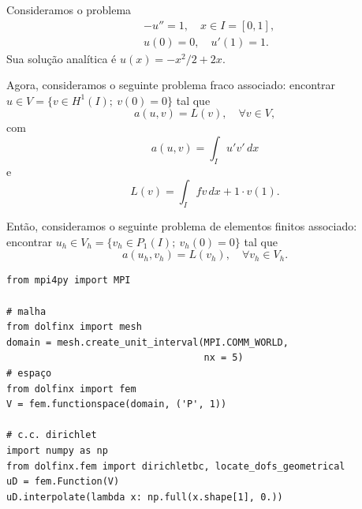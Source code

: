 \begin{ex}\label{ex:cc_n2}
  Consideramos o problema
  \begin{align}
    &-u'' = 1,\quad x\in I=[0,1],\label{eq:ex_cc_n2_eq}\\
    &u(0) = 0,\quad u'(1) = 1.\label{eq:ex_cc_n2_bc}
  \end{align}
Sua solução analítica é $u(x) = -x^2/2+2x$. 

Agora, consideramos o seguinte problema fraco associado: encontrar $u\in V=\{v\in H^1(I);~v(0)=0\}$ tal que
\begin{equation}
  a(u,v) = L(v),\quad\forall v\in V,
\end{equation}
com
\begin{equation}
  a(u, v) = \int_I u'v'\,dx
\end{equation}
e
\begin{equation}
  L(v) = \int_I fv\,dx + 1\cdot v(1).
\end{equation}

Então, consideramos o seguinte problema de elementos finitos associado: encontrar $u_h\in V_h = \{v_h\in P_1(I);~v_h(0)=0\}$ tal que
\begin{equation}
  a(u_h, v_h) = L(v_h),\quad\forall v_h\in V_h.
\end{equation}



\begin{lstlisting}[caption=ex\_mef1d\_neumann\_nh.py]
from mpi4py import MPI

# malha
from dolfinx import mesh
domain = mesh.create_unit_interval(MPI.COMM_WORLD,
                                   nx = 5)
# espaço
from dolfinx import fem
V = fem.functionspace(domain, ('P', 1))

# c.c. dirichlet
import numpy as np
from dolfinx.fem import dirichletbc, locate_dofs_geometrical
uD = fem.Function(V)
uD.interpolate(lambda x: np.full(x.shape[1], 0.))


\end{lstlisting}
\end{ex}
